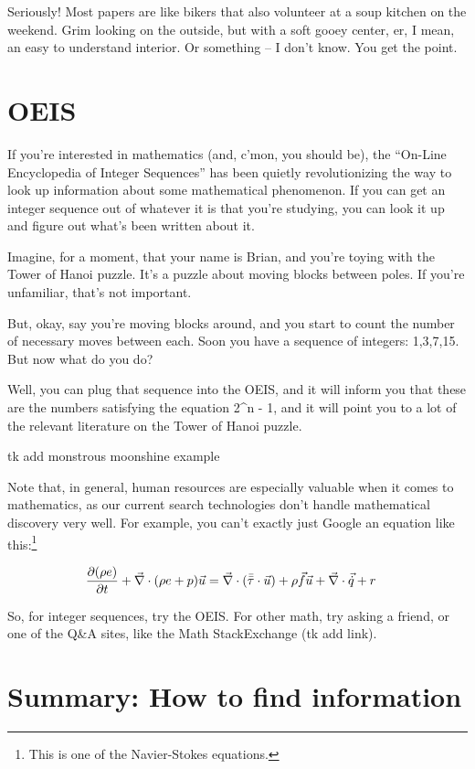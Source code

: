 Seriously! Most papers are like bikers that also volunteer at a soup kitchen on
the weekend. Grim looking on the outside, but with a soft gooey center, er, I
mean, an easy to understand interior. Or something -- I don't know. You get the point.

\section{OEIS}

If you're interested in mathematics (and, c'mon, you should be), the ``On-Line Encyclopedia of Integer
Sequences'' has been quietly revolutionizing the way to look up information
about some mathematical phenomenon. If you can get an integer sequence out of whatever it is that you're studying,
you can look it up and figure out what's been written about it.

Imagine, for a moment, that your name is Brian, and you're toying with the Tower
of Hanoi puzzle. It's a puzzle about moving blocks between poles. If you're
unfamiliar, that's not important.

But, okay, say you're moving blocks around, and you start to count the number of
necessary moves between each. Soon you have a sequence of integers:
1,3,7,15. But now what do you do?

Well, you can plug that sequence into the OEIS, and it will inform you that
these are the numbers satisfying the equation 2^n - 1, and it will point you to
a lot of the relevant literature on the Tower of Hanoi puzzle.

tk add monstrous moonshine example

Note that, in general, human resources are especially valuable when it comes to mathematics,
as our current search technologies don't handle mathematical discovery very
well. For example, you can't exactly just Google an equation like this:\footnote{This is one of the Navier-Stokes equations.}

\begin{align}
      \pdv{(\rho e)}{t}+\vec{\nabla}\cdot(\rho e+p)\vec{u} &= \vec{\nabla}\cdot(\Bar{\Bar{\tau}}\cdot\vec{u})+\rho\vec{f}\vec{u}+\vec{\nabla}\cdot\vec{\dot{q}}+r
\end{align}

So, for integer sequences, try the OEIS. For other math, try asking a friend, or
one of the Q\&A sites, like the Math StackExchange (tk add link).

\section{Summary: How to find information}

